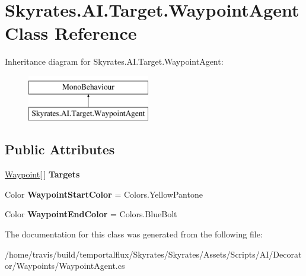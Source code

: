 \hypertarget{class_skyrates_1_1_a_i_1_1_target_1_1_waypoint_agent}{\section{Skyrates.\-A\-I.\-Target.\-Waypoint\-Agent Class Reference}
\label{class_skyrates_1_1_a_i_1_1_target_1_1_waypoint_agent}
}
Inheritance diagram for Skyrates.\-A\-I.\-Target.\-Waypoint\-Agent\-:\begin{figure}[H]
\begin{center}
\leavevmode
\includegraphics[height=2.000000cm]{class_skyrates_1_1_a_i_1_1_target_1_1_waypoint_agent}
\end{center}
\end{figure}
\subsection*{Public Attributes}
\begin{DoxyCompactItemize}
\item 
\hypertarget{class_skyrates_1_1_a_i_1_1_target_1_1_waypoint_agent_a938db2d0006c7f1af2582fa3651d6a8a}{\hyperlink{class_skyrates_1_1_a_i_1_1_target_1_1_waypoint}{Waypoint}\mbox{[}$\,$\mbox{]} {\bfseries Targets}}\label{class_skyrates_1_1_a_i_1_1_target_1_1_waypoint_agent_a938db2d0006c7f1af2582fa3651d6a8a}

\item 
\hypertarget{class_skyrates_1_1_a_i_1_1_target_1_1_waypoint_agent_a81287b76ce8d64406d3b1ebae9ab4df7}{Color {\bfseries Waypoint\-Start\-Color} = Colors.\-Yellow\-Pantone}\label{class_skyrates_1_1_a_i_1_1_target_1_1_waypoint_agent_a81287b76ce8d64406d3b1ebae9ab4df7}

\item 
\hypertarget{class_skyrates_1_1_a_i_1_1_target_1_1_waypoint_agent_a84fb6c16a54ea0bd02e523b914a482eb}{Color {\bfseries Waypoint\-End\-Color} = Colors.\-Blue\-Bolt}\label{class_skyrates_1_1_a_i_1_1_target_1_1_waypoint_agent_a84fb6c16a54ea0bd02e523b914a482eb}

\end{DoxyCompactItemize}


The documentation for this class was generated from the following file\-:\begin{DoxyCompactItemize}
\item 
/home/travis/build/temportalflux/\-Skyrates/\-Skyrates/\-Assets/\-Scripts/\-A\-I/\-Decorator/\-Waypoints/Waypoint\-Agent.\-cs\end{DoxyCompactItemize}
